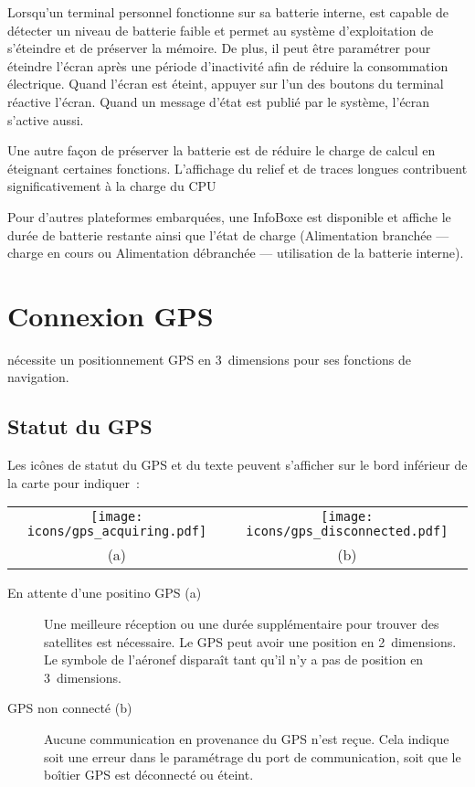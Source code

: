 Lorsqu'un terminal personnel fonctionne sur sa batterie interne, \xc{} est capable de détecter un niveau de batterie faible et permet au système d'exploitation de s'éteindre et de préserver la mémoire.
De plus, il peut être paramétrer pour éteindre l'écran après une période d'inactivité afin de réduire la consommation électrique.
Quand l'écran est éteint, appuyer sur l'un des boutons du terminal réactive l'écran.
Quand un message d'état est publié par le système, l'écran s'active aussi.

Une autre façon de préserver la batterie est de réduire le charge de calcul en éteignant certaines fonctions.
L'affichage du relief et de traces longues contribuent significativement à la charge du CPU

Pour d'autres plateformes embarquées, une InfoBoxe  est disponible et affiche le durée de batterie restante ainsi que l'état de charge (Alimentation branchée --- charge en cours ou Alimentation débranchée --- utilisation de la batterie interne).

\section{Connexion GPS}

\xc{} nécessite un positionnement GPS en 3~dimensions pour ses fonctions de navigation.

\subsection*{Statut du GPS}

Les icônes de statut du GPS et du texte peuvent s'afficher sur le bord inférieur de la carte pour indiquer~:

\begin{tabular}{c c}%
\texttt{[image: icons/gps\_acquiring.pdf]} & \texttt{[image: icons/gps\_disconnected.pdf]}\\
(a) & (b)
\end{tabular}

\begin{description}
\item[En attente d'une positino GPS (a)]  Une meilleure réception ou une durée supplémentaire pour trouver des satellites est nécessaire.
	Le GPS peut avoir une position en 2~dimensions.
	Le symbole de l'aéronef disparaît tant qu'il n'y a pas de position en 3~dimensions.
\item[GPS non connecté (b)] Aucune communication en provenance du GPS n'est reçue.
	Cela indique soit une erreur dans le paramétrage du port de communication, soit que le boîtier GPS est déconnecté ou éteint.
\end{description}


